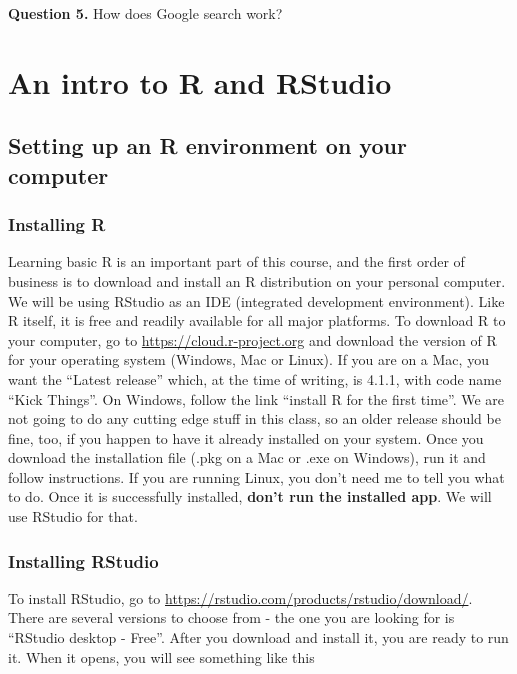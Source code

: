 \documentclass[
]{book}
\theoremstyle{definition}
\theoremstyle{definition}
\theoremstyle{definition}
\theoremstyle{definition}
\theoremstyle{remark}
\begin{document}
\textbf{Question 5.} How does Google search work?

\hypertarget{intro}{%
\chapter{An intro to R and RStudio}\label{intro}}

\hypertarget{setting-up-an-r-environment-on-your-computer}{%
\section{Setting up an R environment on your computer}\label{setting-up-an-r-environment-on-your-computer}}

\hypertarget{installing-r}{%
\subsection{Installing R}\label{installing-r}}

Learning basic R is an important part of this course, and the first order of business is to download and install an R distribution on your personal computer. We will be using RStudio as an IDE (integrated development environment). Like R itself, it is free and readily available for all major platforms. To download R to your computer, go to
\url{https://cloud.r-project.org} and
download the version of R for your operating system (Windows, Mac or Linux). If you are on a Mac, you want the ``Latest release'' which, at the time of writing, is 4.1.1, with code name ``Kick Things''. On Windows, follow the link ``install R for the first time''. We are not going to do any cutting edge stuff in this class, so an older release should be fine, too, if you happen to have it already installed on your system. Once you download the installation file (.pkg on a Mac or .exe on Windows), run it and follow instructions. If you are running Linux, you don't need me to tell you what to do. Once it is successfully installed, \textbf{don't run the installed app}. We will use RStudio for that.

\hypertarget{installing-rstudio}{%
\subsection{Installing RStudio}\label{installing-rstudio}}

To install RStudio, go to \url{https://rstudio.com/products/rstudio/download/}. There are several versions to choose from - the one you are looking for is ``RStudio desktop - Free''. After you download and install it, you are ready to run it. When it opens, you will see something like this
\end{document}
